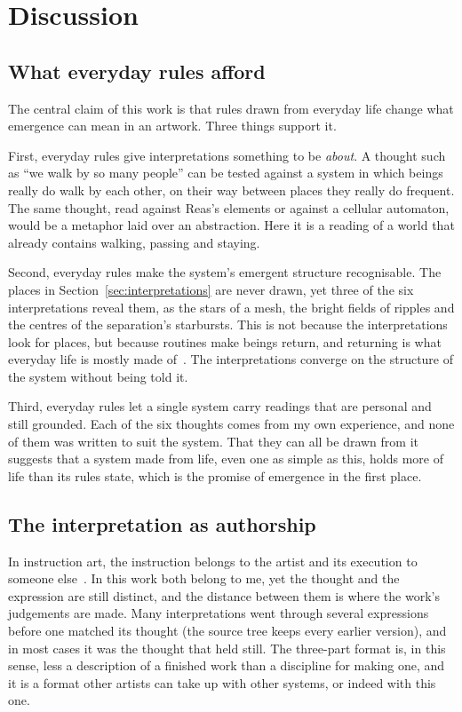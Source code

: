 \section{Discussion}
\label{sec:discussion}

\subsection{What everyday rules afford}

The central claim of this work is that rules drawn from everyday life change what emergence can mean in an artwork. Three things support it.

First, everyday rules give interpretations something to be \emph{about}. A thought such as ``we walk by so many people'' can be tested against a system in which beings really do walk by each other, on their way between places they really do frequent. The same thought, read against Reas's elements or against a cellular automaton, would be a metaphor laid over an abstraction. Here it is a reading of a world that already contains walking, passing and staying.

Second, everyday rules make the system's emergent structure recognisable. The places in Section~\ref{sec:interpretations} are never drawn, yet three of the six interpretations reveal them, as the stars of a mesh, the bright fields of ripples and the centres of the separation's starbursts. This is not because the interpretations look for places, but because routines make beings return, and returning is what everyday life is mostly made of~\cite{gonzalez2008, song2010}. The interpretations converge on the structure of the system without being told it.

Third, everyday rules let a single system carry readings that are personal and still grounded. Each of the six thoughts comes from my own experience, and none of them was written to suit the system. That they can all be drawn from it suggests that a system made from life, even one as simple as this, holds more of life than its rules state, which is the promise of emergence in the first place.

\subsection{The interpretation as authorship}

In instruction art, the instruction belongs to the artist and its execution to someone else~\cite{lewitt1967, ono1964, obrist2013}. In this work both belong to me, yet the thought and the expression are still distinct, and the distance between them is where the work's judgements are made. Many interpretations went through several expressions before one matched its thought (the source tree keeps every earlier version), and in most cases it was the thought that held still. The three-part format is, in this sense, less a description of a finished work than a discipline for making one, and it is a format other artists can take up with other systems, or indeed with this one.

